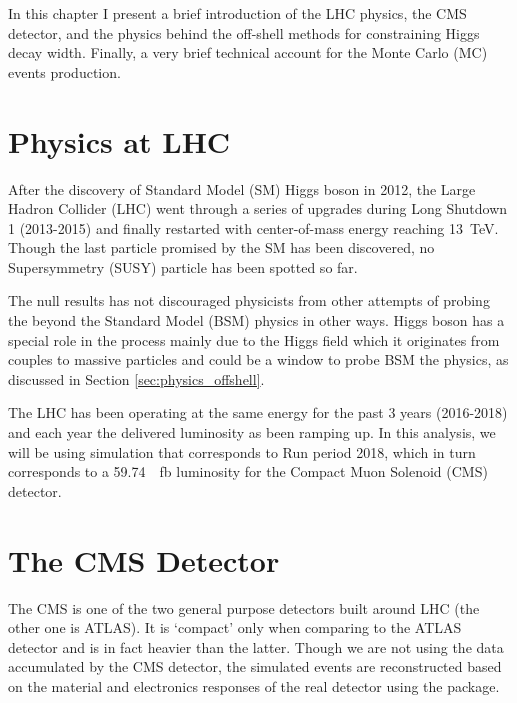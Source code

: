 In this chapter I present a brief introduction of the
LHC physics, the CMS detector, and the physics behind the off-shell methods
for constraining Higgs decay width. Finally, a very brief technical account for
the Monte Carlo (MC) events production.

\section{Physics at LHC}
After the discovery of Standard Model (SM) Higgs boson in 2012, the Large Hadron Collider (LHC)
went through a series of upgrades during Long Shutdown 1 (2013-2015) and finally restarted with center-of-mass energy reaching
\SI{13}{\tera\electronvolt}. Though the last particle promised by the SM has been discovered,
no Supersymmetry (SUSY) particle has been spotted so far.

The null results has not discouraged physicists from other attempts of probing the 
beyond the Standard Model (BSM) physics in other ways. Higgs boson has a special role in
the process mainly due to the Higgs field which it originates from couples to massive particles
and could be a window to probe BSM the physics, as discussed in Section \ref{sec:physics_offshell}.

The LHC has been operating at the same energy for the past 3 years (2016-2018) and each year
the delivered luminosity as been ramping up.\cite{xampl} In this analysis, we will be using
simulation that corresponds to Run period 2018, which in turn corresponds to a 
\SI{59.74}{\per\femto\barn} luminosity for the Compact Muon Solenoid (CMS) detector.\cite{xampl}

\section{The CMS Detector}



The CMS is one of the two general purpose detectors built around LHC (the other one is ATLAS). It
is `compact' only when comparing to the ATLAS detector and is in fact heavier than the latter.
Though we are not using the data accumulated by the CMS detector, the simulated events are
reconstructed based on the material and electronics responses of the real detector using the
\gf package.\cite{geant4}

